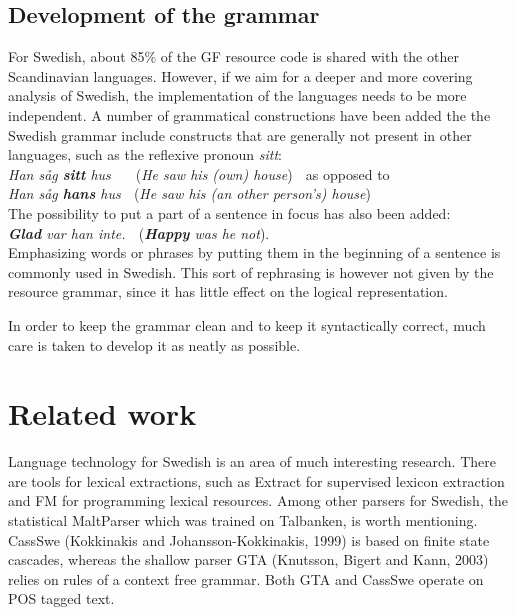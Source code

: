 \documentclass[submission]{eptcs} %
\begin{document}
\subsection{Development of the grammar}
For Swedish, about 85\% of the GF resource code is shared with the other Scandinavian
languages. %
However, if we aim for a deeper and more covering analysis of Swedish,
the implementation of the languages needs to be more independent.
A number of grammatical constructions have been added the the Swedish grammar
include constructs that are generally not present in other languages,
such as the reflexive pronoun \emph{sitt}: \\
\emph{Han såg \textbf{sitt} hus} $\; \; \; \;$ (\emph{He saw his (own) house}) $\;$
as opposed to \\
\emph{Han såg \textbf{hans} hus} $\;$ (\emph{He saw his (an other person's) house}) \\
The possibility to put a part of a sentence in focus has also been added:\\
\emph{\textbf{Glad} var han inte.} $\;$ (\emph{\textbf{Happy} was he not}). \\
Emphasizing words or phrases by putting them in the beginning of a sentence
is commonly used in Swedish.
This sort of rephrasing is however not given by the resource grammar, since it
has little effect on the logical representation.

In order to keep the grammar clean and to keep it syntactically correct,
much care is taken to develop it as neatly as possible. 

\section{Related work}
Language technology for Swedish is an area of much interesting research.
There are tools for lexical extractions, such as
Extract for supervised lexicon extraction and
FM\cite{MarkusForsberg2007} for programming lexical resources.
Among other parsers for Swedish, the statistical MaltParser\cite{malt}
which was trained on Talbanken, is worth mentioning. 
CassSwe (Kokkinakis and Johansson-Kokkinakis, 1999) is based on finite state cascades,
whereas the shallow parser GTA (Knutsson, Bigert and Kann, 2003) relies on rules of 
a context free grammar. Both GTA and CassSwe operate on POS tagged text.
\end{document}
